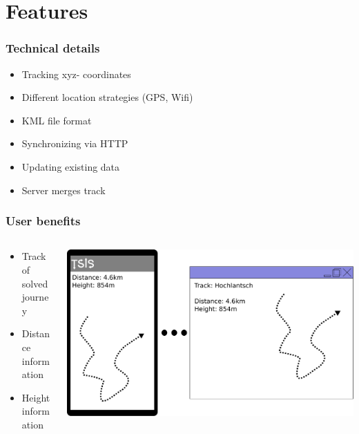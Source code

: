 \section{Features}
\label{sec:features}

\begin{frame}
  \frametitle{Technical details}
  \begin{itemize}
  \item Tracking xyz- coordinates
  \item Different location strategies (GPS, Wifi)
  \item KML file format
  \item Synchronizing via HTTP
  \item Updating existing data
  \item Server merges track
  \end{itemize}
\end{frame}

\begin{frame}
  \frametitle{User benefits}
  \begin{columns}[onlytextwidth]
    \begin{column}{0.5\textwidth}
      \begin{itemize}
      \item Track of solved journey
      \item Distance information
      \item Height information
      \end{itemize}
    \end{column}
    \begin{column}{0.5\textwidth}
      \begin{center}
        \includegraphics[width=1\textwidth]{images/transfer.pdf}
      \end{center}
    \end{column}
  \end{columns}
\end{frame}
